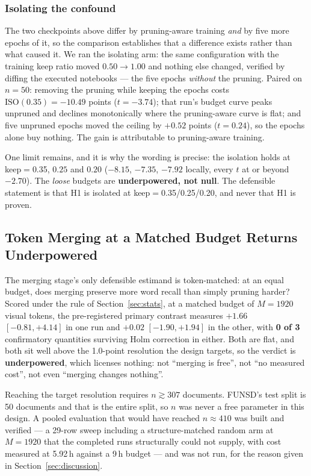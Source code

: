 \documentclass[conference]{IEEEtran}
\begin{document}
\subsubsection{Isolating the confound}
The two checkpoints above differ by pruning-aware training \emph{and} by five more epochs of
it, so the comparison establishes that a difference exists rather than what caused it. We ran
the isolating arm: the same configuration with the training keep ratio moved
$0.50 \rightarrow 1.00$ and nothing else changed, verified by diffing the executed
notebooks --- the five epochs \emph{without} the pruning. Paired on $n = 50$: removing the
pruning while keeping the epochs costs $\mathrm{ISO}(0.35) = \bm{-10.49}$ points
($t = -3.74$); that run's budget curve peaks unpruned and declines monotonically where the
pruning-aware curve is flat; and five unpruned epochs moved the ceiling by $+0.52$ points
($t = 0.24$), so the epochs alone buy nothing. The gain is attributable to pruning-aware
training.

One limit remains, and it is why the wording is precise: the isolation holds at keep$=$0.35,
$0.25$ and $0.20$ ($-8.15$, $-7.35$, $-7.92$ locally, every $t$ at or beyond $-2.70$). The
\emph{loose} budgets are \textbf{underpowered, not null}. The defensible statement is that H1
is isolated at keep$=$0.35/0.25/0.20, and never that H1 is proven.

\subsection{Token Merging at a Matched Budget Returns Underpowered}
\label{sec:merge}

The merging stage's only defensible estimand is token-matched: at an equal budget, does
merging preserve more word recall than simply pruning harder? Scored under the rule of
Section~\ref{sec:stats}, at a matched budget of $M = 1920$ visual tokens, the pre-registered
primary contrast measures $\bm{+1.66}$ $[-0.81, +4.14]$ in one run and $\bm{+0.02}$
$[-1.90, +1.94]$ in the other, with \textbf{0 of 3} confirmatory quantities surviving Holm
correction in either. Both are flat, and both sit well above the 1.0-point resolution the
design targets, so the verdict is \textbf{underpowered}, which licenses nothing: not
``merging is free'', not ``no measured cost'', not even ``merging changes nothing''.

Reaching the target resolution requires $n \gtrsim 307$ documents. FUNSD's test split is 50
documents and that is the entire split, so $n$ was never a free parameter in this design. A
pooled evaluation that would have reached $n \approx 410$ was built and verified --- a
29-row sweep including a structure-matched random arm at $M = 1920$ that the completed runs
structurally could not supply, with cost measured at 5.92\,h against a 9\,h budget --- and
was not run, for the reason given in Section~\ref{sec:discussion}.
\end{document}
